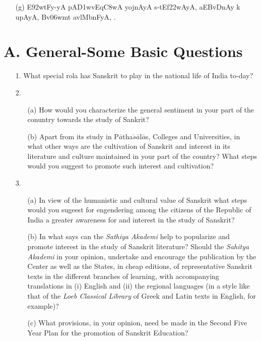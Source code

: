 \begin{itemize}
\begin{itemize}
                      \item[({\dn g})] {\dn E\392wtFy-yA\2 pA\3D1wvEq\0\3C8wA\2 yojnAyA\2 s\2-tEf\322wAyA, aEBvD\0nAy k\? upAyA, Bv\306wmt\? avlMbnFyA, .}
                      \end{itemize} 
\end{itemize}

{\rm 
\section*{{\rm A. General-Some Basic Questions}}

\noindent
\begin{itemize}
  
  \item[1.] What special rola has Sanskrit to play in the national life of India to-day?
  
  \item[2.] \begin{itemize}
            \item[(a)] How would you characterize the general sentiment in your part of the conuntry towards the study of Sankrit?  
              
              \item[(b)] Apart from its study in P$\bar{a}$tha$\acute{s}\bar{a}$l$\bar{a}$s, Colleges and Universities, in what other ways are the cultivation of Sanskrit and interest in its literature and culture maintained in your part of the country? What steps would you suggest to promote such interest and cultivation?
             \end{itemize}
  \item[3.]\begin{itemize}
           \item[(a)] In view of the humanistic and cultural value of Sanskrit what steps would you sugeest for engendering among the citizens of the Republic of India a greater awareness for and interest in the study of Sanskrit?
           
           \item[(b)] In what says can the {\textit {Sathiya Akademi}} help to popularize and promote interest in the study of Sanskrit literature? Should the {\textit {Sahitya Akademi}} in your opinion, undertake and encourage the publication by the Center as well as the States, in cheap editions, of representative Sanskrit texts in the different branches of learning, with accompanying translations in (i) English and (ii) the regional languages (in a style like that of the {\textit {Loeb Classical Library}} of Greek and Latin texts in English, for example)?
           
           \item[(c)] What provisions, in your opinion, need be made in the Second Five Year Plan for the promotion of Sanskrit Education?
           \end{itemize}
\end{itemize}           
}

